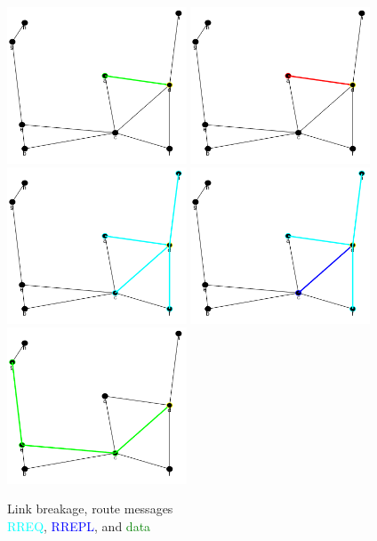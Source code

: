 \documentclass[conference]{IEEEtran}
\begin{document}
\begin{figure}[ht]
	\centering
	\includegraphics[width=2.1in]{Ex_3_data_1.png}
	\includegraphics[width=2.1in]{Ex_3_error.png}
	\includegraphics[width=2.1in]{Ex_3_request.png}
	\includegraphics[width=2.1in]{Ex_3_reply.png}
	\includegraphics[width=2.1in]{Ex_3_data_2.png}
	\caption{Link breakage, route messages \\
			\textcolor{cyan}{RREQ}, \textcolor{blue}{RREPL}, and \textcolor{green}{data} }
	\label{fig:ex_3}
\end{figure}
\end{document}
